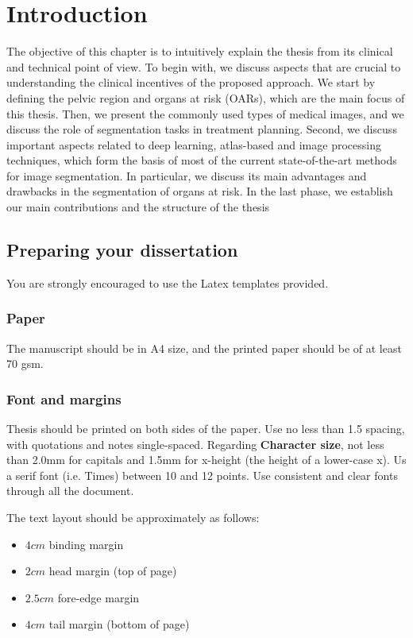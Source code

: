 \chapter{Introduction} \label{chap:intro}
The objective of this chapter is to intuitively explain the thesis from its clinical and technical 
point of view. To begin with, we discuss aspects that are crucial to understanding the clinical
incentives of the proposed approach. We start by defining the pelvic region and organs at risk (OARs), which are
the main focus of this thesis. Then, we present the commonly used types of medical
images, and we discuss the role of segmentation tasks in treatment planning.
Second, we discuss important aspects related to deep learning, atlas-based and image processing techniques, 
which form the basis of most of the current state-of-the-art methods for image segmentation. In particular,
we discuss its main advantages and drawbacks in the segmentation of organs at risk.
In the last phase, we establish our main contributions and the structure of the thesis
\section{Preparing your dissertation} \label{sect:thefirst}

You are strongly encouraged to use the Latex templates provided.

\subsection{Paper}
The manuscript should be in A4 size, and the printed paper should
be of at least 70 gsm.

\subsection{Font and margins}
Thesis should be printed on both sides of the paper. Use no less
than 1.5 spacing, with quotations and notes single-spaced.
Regarding \textbf{Character size}, not less than 2.0mm for
capitals and 1.5mm for x-height (the height of a lower-case x). Us
a serif font (i.e. Times) between 10 and 12 points. Use consistent
and clear fonts through all the document.

The text layout should be approximately as follows:

\begin{itemize}
    \item $4cm$ binding margin
    \item $2cm$ head margin (top of page)
    \item $2.5cm$ fore-edge margin
    \item $4cm$ tail margin (bottom of page)
\end{itemize}

